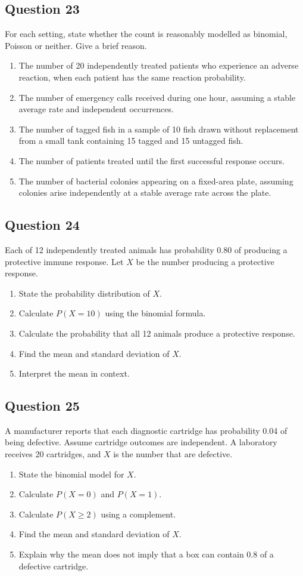\documentclass[10pt,letterpaper]{article}
\newcommand{\questionheading}[1]{%
  \subsection*{Question #1}
}
\begin{document}
\questionheading{23}
For each setting, state whether the count is reasonably modelled as binomial, Poisson or neither. Give a brief reason.
\begin{enumerate}
	\item The number of 20 independently treated patients who experience an adverse reaction, when each patient has the same reaction probability.
	\item The number of emergency calls received during one hour, assuming a stable average rate and independent occurrences.
	\item The number of tagged fish in a sample of 10 fish drawn without replacement from a small tank containing 15 tagged and 15 untagged fish.
	\item The number of patients treated until the first successful response occurs.
	\item The number of bacterial colonies appearing on a fixed-area plate, assuming colonies arise independently at a stable average rate across the plate.
\end{enumerate}

\questionheading{24}
Each of 12 independently treated animals has probability 0.80 of producing a protective immune response. Let $X$ be the number producing a protective response.
\begin{enumerate}
	\item State the probability distribution of $X$.
	\item Calculate $P(X=10)$ using the binomial formula.
	\item Calculate the probability that all 12 animals produce a protective response.
	\item Find the mean and standard deviation of $X$.
	\item Interpret the mean in context.
\end{enumerate}

\newpage

\questionheading{25}
A manufacturer reports that each diagnostic cartridge has probability 0.04 of being defective. Assume cartridge outcomes are independent. A laboratory receives 20 cartridges, and $X$ is the number that are defective.
\begin{enumerate}
	\item State the binomial model for $X$.
	\item Calculate $P(X=0)$ and $P(X=1)$.
	\item Calculate $P(X\geq2)$ using a complement.
	\item Find the mean and standard deviation of $X$.
	\item Explain why the mean does not imply that a box can contain 0.8 of a defective cartridge.
\end{enumerate}
\end{document}
